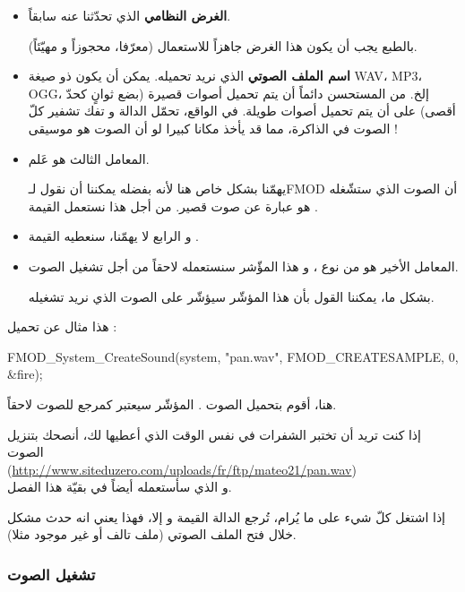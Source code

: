 \begin{itemize}
	\item \textbf{الغرض النظامي}
	 الذي تحدّثنا عنه سابقاً.
	
	بالطبع يجب أن يكون هذا الغرض جاهزاً للاستعمال (معرّفا، محجوزاً و مهيّئاً).
	\item \textbf{اسم الملف الصوتي}
	الذي نريد تحميله. يمكن أن يكون ذو صيغة
	\textenglish{WAV}، \textenglish{MP3}، \textenglish{OGG}،
	إلخ. من المستحسن دائماً أن يتم تحميل أصوات قصيرة (بضع ثوانٍ كحدّ أقصى) على أن يتم تحميل أصوات طويلة. في الواقع، تحمّل الدالة و تفك تشفير كلّ الصوت في الذاكرة، مما قد يأخذ مكانا كبيرا لو أن الصوت هو موسيقى !
	\item المعامل الثالث هو عَلم. 
	
	يهمّنا بشكل خاص هنا لأنه بفضله يمكننا أن نقول لـ\textenglish{FMOD}
	أن الصوت الذي ستشّغله هو عبارة عن صوت قصير. من أجل هذا نستعمل القيمة
	.
	\item و الرابع لا يهمّنا، سنعطيه القيمة 
	.
	\item المعامل الأخير هو من نوع
	،
	و هذا المؤّشر سنستعمله لاحقاً من أجل تشغيل الصوت.
	
	بشكل ما، يمكننا القول بأن هذا المؤشّر سيؤشّر على الصوت الذي نريد تشغيله.
\end{itemize}

 هذا مثال عن تحميل :

\begin{Csource}
FMOD_System_CreateSound(system, "pan.wav", FMOD_CREATESAMPLE, 0, &fire);
\end{Csource}

هنا، أقوم بتحميل الصوت
.
المؤشّر
سيعتبر كمرجع للصوت لاحقاً.

\begin{information}
 إذا كنت تريد أن تختبر الشفرات في نفس الوقت الذي أعطيها لك، أنصحك بتنزيل الصوت
\\
 (\url{http://www.siteduzero.com/uploads/fr/ftp/mateo21/pan.wav})\\
 و الذي سأستعمله أيضاً في بقيّة هذا الفصل.
\end{information}

إذا اشتغل كلّ شيء على ما يُرام، تُرجع الدالة القيمة
و إلا، فهذا يعني انه حدث مشكل خلال فتح الملف الصوتي (ملف تالف أو غير موجود مثلا).

\subsubsection{تشغيل الصوت}

